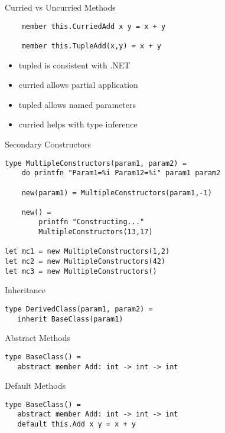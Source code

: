 \documentclass{beamer}
\begin{document}
\begin{frame}[fragile]{Curried vs Uncurried Methods}
  \begin{verbatim}
    member this.CurriedAdd x y = x + y

    member this.TupleAdd(x,y) = x + y
  \end{verbatim}
  \pause
  \begin{itemize}[<+->]
    \item tupled is consistent with .NET
    \item curried allows partial application
    \item tupled allows named parameters
    \item curried helps with type inference
  \end{itemize}
\end{frame}

\begin{frame}[fragile]{Secondary Constructors}
  \begin{verbatim}
type MultipleConstructors(param1, param2) =
    do printfn "Param1=%i Param12=%i" param1 param2

    new(param1) = MultipleConstructors(param1,-1)

    new() =
        printfn "Constructing..."
        MultipleConstructors(13,17)

let mc1 = new MultipleConstructors(1,2)
let mc2 = new MultipleConstructors(42)
let mc3 = new MultipleConstructors()
  \end{verbatim}
\end{frame}

\begin{frame}[fragile]{Inheritance}
  \begin{verbatim}
type DerivedClass(param1, param2) =
   inherit BaseClass(param1)
  \end{verbatim}
\end{frame}

\begin{frame}[fragile]{Abstract Methods}
  \begin{verbatim}
type BaseClass() =
   abstract member Add: int -> int -> int
  \end{verbatim}
\end{frame}

\begin{frame}[fragile]{Default Methods}
  \begin{verbatim}
type BaseClass() =
   abstract member Add: int -> int -> int
   default this.Add x y = x + y
  \end{verbatim}
\end{frame}
\end{document}

